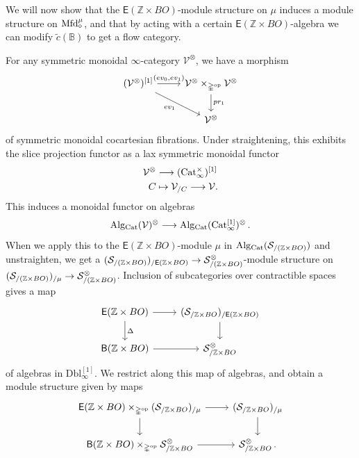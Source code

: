 \documentclass[10pt]{amsart}
\numberwithin{equation}{section}
\theoremstyle{definition}
\DeclareMathOperator{\op}{op}
\newcommand{\Cat}{\mathrm{Cat}\vphantom{t}}
\newcommand{\Mfd}{\mathrm{Mfd}\vphantom{d}}
\newcommand{\Alg}{\mathrm{Alg}\vphantom{z}}
\newcommand{\bB}{\mathbb{B}}
\newcommand{\bZ}{\mathbb{Z}}
\newcommand{\Simp}{\mathbb{\Delta}}
\newcommand{\cS}{\mathcal{S}}
\newcommand{\cV}{\mathcal{V}}
\newcommand{\sfB}{\mathsf{B}}
\newcommand{\sfE}{\mathsf{E}}
\newcommand{\Dbl}{\mathrm{Dbl}}
\renewcommand{\to}{\mathchoice{\longrightarrow}{\rightarrow}{}{}}
\begin{document}
We will now show that the $\sfE(\bZ\times BO)$-module structure on $\mu$ induces a module structure on $\Mfd^{\mu}_{\diamond}$, and that by acting with a certain $\sfE(\bZ\times BO)$-algebra we can modify $\tilde{c}(\bB)$ to get a flow category.

For any symmetric monoidal $\infty$-category $\cV^{\otimes}$, we have a morphism
\begin{equation*}
	\begin{tikzcd}
		(\cV^{\otimes})^{[1]} \arrow[r,"{(ev_{0},ev_{1})}"] \arrow[dr, "ev_{1}"']      &   \cV^{\otimes}\times_{\Simp^{\op}} \cV^{\otimes}  \arrow[d, "pr_{1}"] \\
              & \cV^{\otimes}
	\end{tikzcd}
\end{equation*}
of symmetric monoidal cocartesian fibrations.
Under straightening, this exhibits the slice projection functor as a lax symmetric monoidal functor
\begin{align*}
	\cV^{\otimes} &\to (\Cat_{\infty}^{\times})^{[1]} \\
	C &\mapsto \cV_{/C} \to \cV.
\end{align*}
This induces a monoidal functor on algebras
\begin{align*}
	\Alg_{\Cat}(\cV)^{\otimes} \to \Alg_{\Cat}(\Cat_{\infty}^{[1]}  )^{\otimes} \,.
\end{align*}
When we apply this to the $\sfE(\bZ\times BO)$-module $\mu$ in $\Alg_{\Cat}(\cS_{/ (\bZ\times BO)})$ and unstraighten, we get a $(\cS_{/ (\bZ\times BO)})_{/\sfE(\bZ \times BO)} \to \cS_{/ (\bZ\times BO)}^{\otimes}$-module structure on $(\cS_{/ (\bZ\times BO)})_{/\mu} \to \cS_{/ (\bZ\times BO)}^{\otimes}$.
Inclusion of subcategories over contractible spaces gives a map
\begin{equation*}
	\begin{tikzcd}
		\sfE(\bZ\times BO) \arrow[r] \arrow[d, "\Delta"]      &   (\cS_{/ \bZ\times BO})_{/\sfE(\bZ\times BO)}  \arrow[d] \\
		\sfB(\bZ\times BO)  \arrow[r]               &   \cS_{/ \bZ\times BO}^{\otimes}
	\end{tikzcd}
\end{equation*}
of algebras in $\Dbl_{\infty}^{[1]}$.
We restrict along this map of algebras, and obtain a module structure given by maps
\begin{equation*}
	\begin{tikzcd}
		\sfE(\bZ\times BO)\times_{\Simp^{\op}} (\cS_{/ \bZ\times BO})_{/\mu} \arrow[r] \arrow[d]      &   (\cS_{/\bZ\times BO})_{/\mu}  \arrow[d] \\
		\sfB(\bZ\times BO) \times_{\Simp^{\op}} \cS_{/ \bZ\times BO}^{\otimes}  \arrow[r]               &  \cS_{/ \bZ\times BO}^{\otimes} \,.
	\end{tikzcd}
\end{equation*}
\end{document}
